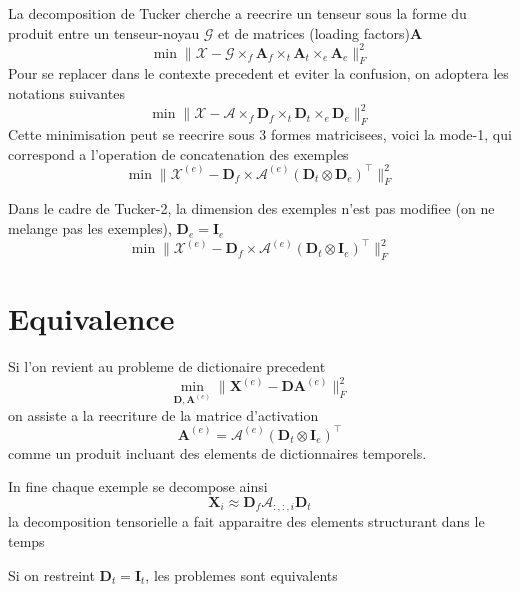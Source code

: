 \documentclass{article}
\begin{document}
La decomposition de Tucker cherche a reecrire un tenseur sous la forme du produit entre un tenseur-noyau $\mathcal{G}$ et de matrices (loading factors)$\mathbf{A}$
$$
\min \|\mathcal{X} -  \mathcal{G} \times_f \mathbf{A}_f \times_t \mathbf{A}_t \times_e \mathbf{A}_e   \|_{F}^2
$$
Pour se replacer dans le contexte precedent et eviter la confusion, on adoptera les notations suivantes
$$
\min \|\mathcal{X} -  \mathcal{A} \times_f \mathbf{D}_f \times_t \mathbf{D}_t \times_e \mathbf{D}_e   \|_{F}^2
$$
Cette minimisation peut se reecrire sous 3 formes matricisees, voici la mode-1, qui correspond a l'operation de concatenation des exemples
$$
\min \|\mathcal{X}^{(e)} -  \mathbf{D}_f \times  \mathcal{A}^{(e)} \left( \mathbf{D}_t \otimes \mathbf{D}_e \right)^\top  \|_{F}^2
$$


Dans le cadre de Tucker-2, la dimension des exemples n'est pas modifiee (on ne melange pas les exemples), $\mathbf{D}_e=\mathbf{I}_e$
$$
\min \|\mathcal{X}^{(e)} -  \mathbf{D}_f \times  \mathcal{A}^{(e)} \left( \mathbf{D}_t \otimes \mathbf{I}_e \right)^\top  \|_{F}^2
$$

\section{Equivalence}

Si l'on revient au probleme de dictionaire precedent
$$
\min_{\mathbf{D},\mathbf{A}^{(e)}}  \|\mathbf{X}^{(e)} -  \mathbf{D} \mathbf{A}^{(e)} \|_{F}^2
$$
on assiste a la reecriture de la matrice d'activation 
$$
 \mathbf{A}^{(e)}=\mathcal{A}^{(e)} \left( \mathbf{D}_t \otimes \mathbf{I}_e \right)^\top
$$
comme un produit incluant des elements de dictionnaires temporels.

In fine chaque exemple se decompose ainsi
$$
\mathbf{X}_i  \approx \mathbf{D}_f \mathcal{A}_{:,:,i}  \mathbf{D}_t 
$$
la decomposition tensorielle a fait apparaitre des elements structurant dans le temps



Si on restreint $\mathbf{D}_t = \mathbf{I}_t$, les problemes sont equivalents
\end{document}
